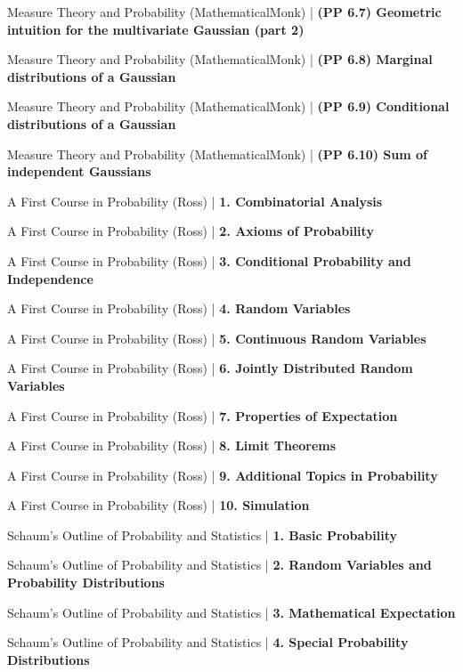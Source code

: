 \documentclass[a4, landscape, 12pt]{article}
\newcommand{\checkbox}{$\square$}%
\begin{document}
\begin{itemize}
{{}
\item [\checkbox] Measure Theory and Probability (MathematicalMonk)  | \textbf{(PP 6.7) Geometric intuition for the multivariate Gaussian (part 2)
}
\item [\checkbox] Measure Theory and Probability (MathematicalMonk)  | \textbf{(PP 6.8) Marginal distributions of a Gaussian
}
\item [\checkbox] Measure Theory and Probability (MathematicalMonk)  | \textbf{(PP 6.9) Conditional distributions of a Gaussian
}
\item [\checkbox] Measure Theory and Probability (MathematicalMonk)  | \textbf{(PP 6.10) Sum of independent Gaussians
}
\item [\checkbox] A First Course in Probability (Ross)  | \textbf{1. Combinatorial Analysis
}
\item [\checkbox] A First Course in Probability (Ross)  | \textbf{2. Axioms of Probability
}
\item [\checkbox] A First Course in Probability (Ross)  | \textbf{3. Conditional Probability and Independence
}
\item [\checkbox] A First Course in Probability (Ross)  | \textbf{4. Random Variables
}
\item [\checkbox] A First Course in Probability (Ross)  | \textbf{5. Continuous Random Variables
}
\item [\checkbox] A First Course in Probability (Ross)  | \textbf{6. Jointly Distributed Random Variables
}
\item [\checkbox] A First Course in Probability (Ross)  | \textbf{7. Properties of Expectation
}
\item [\checkbox] A First Course in Probability (Ross)  | \textbf{8. Limit Theorems
}
\item [\checkbox] A First Course in Probability (Ross)  | \textbf{9. Additional Topics in Probability
}
\item [\checkbox] A First Course in Probability (Ross)  | \textbf{10. Simulation
}
\item [\checkbox] Schaum's Outline of Probability and Statistics  | \textbf{1. Basic Probability
}
\item [\checkbox] Schaum's Outline of Probability and Statistics  | \textbf{2. Random Variables and Probability Distributions
}
\item [\checkbox] Schaum's Outline of Probability and Statistics  | \textbf{3. Mathematical Expectation
}
\item [\checkbox] Schaum's Outline of Probability and Statistics  | \textbf{4. Special Probability Distributions
}}
\end{itemize}
\end{document}
